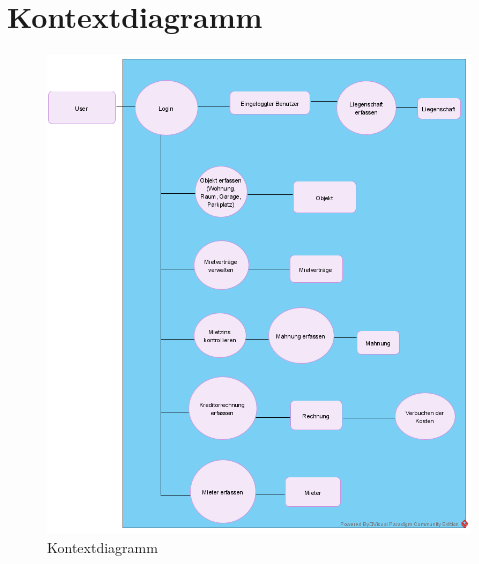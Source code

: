 \section{Kontextdiagramm}
\begin{figure}[H]
  \begin{center}
    \includegraphics[width=0.99\linewidth]{content/diagrams/out/contextdiagram/context.png}
    \caption{Kontextdiagramm}
  \end{center}
\end{figure}